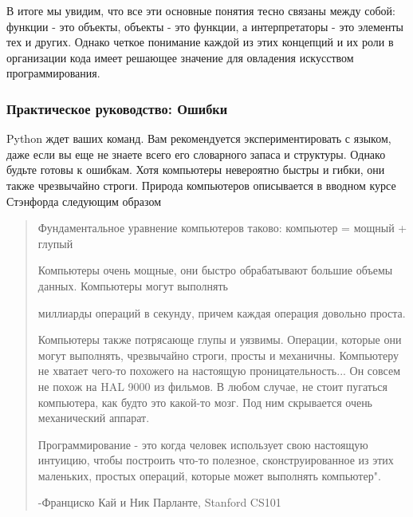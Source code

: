 В итоге мы увидим, что все эти основные понятия тесно связаны между собой: функции - это объекты, объекты - это функции, а интерпретаторы - это элементы тех и других. Однако четкое понимание каждой из этих концепций и их роли в организации кода имеет решающее значение для овладения искусством программирования.

\subsubsection{Практическое руководство: Ошибки}
Python ждет ваших команд. Вам рекомендуется экспериментировать с языком, даже если вы еще не знаете всего его словарного запаса и структуры. Однако будьте готовы к ошибкам. Хотя компьютеры невероятно быстры и гибки, они также чрезвычайно строги. Природа компьютеров описывается в вводном курсе Стэнфорда следующим образом

\begin{quotation}
Фундаментальное уравнение компьютеров таково: компьютер = мощный + глупый

Компьютеры очень мощные, они быстро обрабатывают большие объемы данных. Компьютеры могут выполнять

миллиарды операций в секунду, причем каждая операция довольно проста.

Компьютеры также потрясающе глупы и уязвимы. Операции, которые они могут выполнять, чрезвычайно строги, просты и механичны. Компьютеру не хватает чего-то похожего на настоящую проницательность... Он совсем не похож на HAL 9000 из фильмов. В любом случае, не стоит пугаться компьютера, как будто это какой-то мозг. Под ним скрывается очень механический аппарат.

Программирование - это когда человек использует свою настоящую интуицию, чтобы построить что-то полезное, сконструированное из этих маленьких, простых операций, которые может выполнять компьютер".

-Франциско Кай и Ник Парланте, Stanford CS101
\end{quotation}